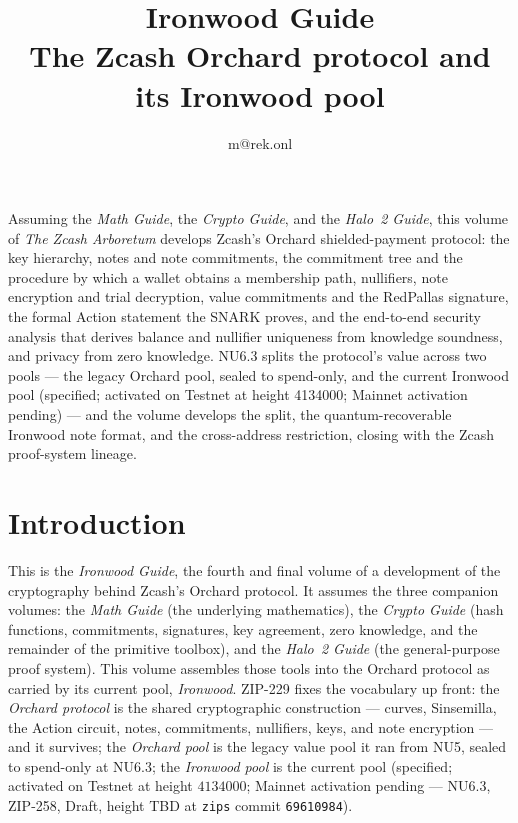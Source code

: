 \documentclass[11pt,a4paper]{article}
\title{\textbf{\Huge Ironwood Guide}\\[6pt]\large The Zcash Orchard protocol and its Ironwood pool}
\author{m@rek.onl}
\date{}
\theoremstyle{definition}
\renewenvironment{abstract}{%
  \small\begin{center}{\bfseries\abstractname}\end{center}\medskip\noindent\ignorespaces
}{\par\medskip}
\begin{document}
\maketitle
\thispagestyle{empty}
\begin{abstract}
Assuming the \emph{Math Guide}, the \emph{Crypto Guide}, and the \emph{Halo~2 Guide}, this volume of \emph{The Zcash Arboretum} develops Zcash's Orchard shielded-payment protocol: the key hierarchy, notes and note commitments, the commitment tree and the procedure by which a wallet obtains a membership path, nullifiers, note encryption and trial decryption, value commitments and the RedPallas signature, the formal Action statement the SNARK proves, and the end-to-end security analysis that derives balance and nullifier uniqueness from knowledge soundness, and privacy from zero knowledge. NU6.3 splits the protocol's value across two pools --- the legacy Orchard pool, sealed to spend-only, and the current Ironwood pool (specified; activated on Testnet at height 4134000; Mainnet activation pending) --- and the volume develops the split, the quantum-recoverable Ironwood note format, and the cross-address restriction, closing with the Zcash proof-system lineage.
\end{abstract}
\clearpage
\tableofcontents
\clearpage

\section{Introduction}\label{sec:intro}
This is the \emph{Ironwood Guide}, the fourth and final volume of a development of the cryptography
behind Zcash's Orchard protocol. It assumes the three companion volumes: the \emph{Math Guide}
(the underlying mathematics), the \emph{Crypto Guide} (hash functions, commitments, signatures,
key agreement, zero knowledge, and the remainder of the primitive toolbox), and the \emph{Halo~2 Guide}
(the general-purpose proof system). This volume assembles those tools into the Orchard
protocol as carried by its current pool, \emph{Ironwood}. ZIP-229 fixes the
vocabulary up front: the \emph{Orchard protocol} is the shared cryptographic
construction --- curves, Sinsemilla, the Action circuit, notes, commitments,
nullifiers, keys, and note encryption --- and it survives; the \emph{Orchard
pool} is the legacy value pool it ran from NU5, sealed to spend-only at
NU6.3; the \emph{Ironwood pool} is the current pool (specified; activated on
Testnet at height $4134000$; Mainnet activation pending --- NU6.3, ZIP-258,
Draft, height TBD at \texttt{zips} commit \texttt{69610984}).
\end{document}

